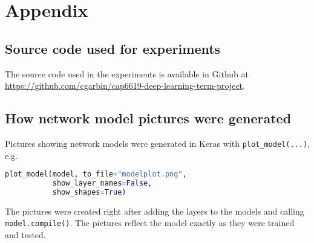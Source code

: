 \documentclass[conference]{IEEEtran}
\begin{document}
\printbibliography

\section{Appendix}

\subsection{Source code used for experiments}

The source code used in the experiments is available in Github at \url{https://github.com/cgarbin/cap6619-deep-learning-term-project}.

\subsection{How network model pictures were generated}

Pictures showing network models were generated in Keras with \verb|plot_model(...)|, e.g. 

\begin{lstlisting}[language=Python]
plot_model(model, to_file="modelplot.png",
           show_layer_names=False,
           show_shapes=True)
\end{lstlisting}

The pictures were created right after adding the layers to the models and calling \verb|model.compile()|. The pictures reflect the model exactly as they were trained and tested.
\end{document}
